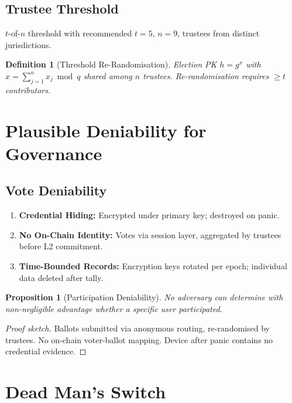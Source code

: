 \documentclass[11pt,a4paper]{article}
\newtheorem{definition}{Definition}[section]
\newtheorem{proposition}{Proposition}[section]
\begin{document}
\subsection{Trustee Threshold}

$t$-of-$n$ threshold with recommended $t = 5$, $n = 9$, trustees from
distinct jurisdictions.

\begin{definition}[Threshold Re-Randomisation]
    Election PK $h = g^x$ with $x = \sum_{j=1}^n x_j \bmod q$ shared
    among $n$ trustees.  Re-randomisation requires $\geq t$ contributors.
\end{definition}

\section{Plausible Deniability for Governance}
\label{sec:deniability}

\subsection{Vote Deniability}

\begin{enumerate}
    \item \textbf{Credential Hiding:} Encrypted under primary key;
    destroyed on panic.
    \item \textbf{No On-Chain Identity:} Votes via session layer,
    aggregated by trustees before L2 commitment.
    \item \textbf{Time-Bounded Records:} Encryption keys rotated per
    epoch; individual data deleted after tally.
\end{enumerate}

\begin{proposition}[Participation Deniability]
    No adversary can determine with non-negligible advantage whether a
    specific user participated.
\end{proposition}

\begin{proof}[Proof sketch]
    Ballots submitted via anonymous routing, re-randomised by trustees.
    No on-chain voter-ballot mapping.  Device after panic contains no
    credential evidence.
\end{proof}

\section{Dead Man's Switch}
\label{sec:dead-man}
\end{document}
